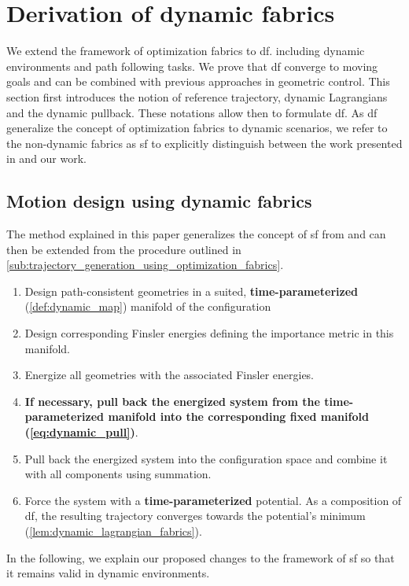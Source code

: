 \section{Derivation of dynamic fabrics}%
\label{sec:methods}

We extend the framework of optimization fabrics to \acf{df}.
including
dynamic environments and path following tasks. We prove that \ac{df}
converge to moving goals and can be combined with previous approaches in geometric
control.
%
This section first introduces the notion of reference trajectory, dynamic Lagrangians and
the dynamic pullback. These notations allow then to formulate \ac{df}. 
As \ac{df} generalize the concept of optimization fabrics to dynamic scenarios, we refer 
to the non-dynamic fabrics as \acf{sf} to explicitly distinguish between the work
presented in \cite{Ratliff2020} and our work.

\subsection{Motion design using dynamic fabrics}%
\label{sub:motion_design_using_dynamic_fabrics}

The method explained in this paper generalizes the concept of \ac{sf}
from \cite{Ratliff2020} and can then be extended from the procedure outlined in \cref{sub:trajectory_generation_using_optimization_fabrics}.

\begin{enumerate}
  \item Design path-consistent geometries in a suited, \textbf{time-parameterized} (\cref{def:dynamic_map}) manifold of the configuration
  \item Design corresponding Finsler energies defining the importance metric in this manifold.
  \item Energize all geometries with the associated Finsler energies.
  \item \textbf{If necessary, pull back the energized system from the time-parameterized manifold into
    the corresponding fixed manifold (\cref{eq:dynamic_pull})}.
  \item Pull back the energized system into the configuration space and combine it with
    all components using summation.
  \item Force the system with a \textbf{time-parameterized} potential. As a composition of \ac{df}, 
    the resulting trajectory converges towards the potential's minimum (\cref{lem:dynamic_lagrangian_fabrics}).
\end{enumerate}
In the following, we explain our proposed changes to the framework of \ac{sf} so that it remains
valid in dynamic environments.


